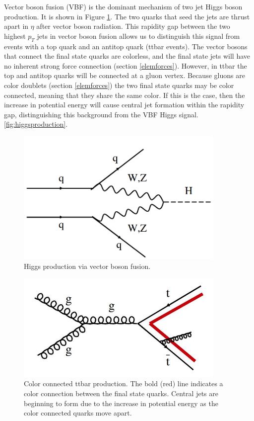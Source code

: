 \documentclass[oneside, letterpaper, oldfontcommands]{memoir}
\begin{document}
\qquad Vector boson fusion (VBF) is the dominant mechanism of two jet Higgs boson production. It is shown in Figure \ref{fig:vbfHiggs}. The two quarks that seed the jets are thrust apart in $\eta$ after vector boson radiation. This rapidity gap between the two highest $p_{T}$ jets in vector boson fusion allows us to distinguish this signal from events with a top quark and an antitop quark (ttbar events). The vector bosons that connect the final state quarks are colorless, and the final state jets will have no inherent strong force connection (section \ref{elemforces}). However, in ttbar the top and antitop quarks will be connected at a gluon vertex. Because gluons are color doublets (section \ref{elemforces}) the two final state quarks may be color connected, meaning that they share the same color. If this is the case, then the increase in potential energy will cause central jet formation within the rapidity gap, distinguishing this background from the VBF Higgs signal. \ref{fig:higgsproduction}\cite{Dittmaier:2011ti}.

\begin{figure}[here]
\includegraphics[width=0.9\textwidth]{vbfHiggs.png}
\caption{Higgs production via vector boson fusion.}
\label{fig:vbfHiggs}
\end{figure}

\begin{figure}[here]
\includegraphics[width=0.9\textwidth]{ttbarcolor.jpg}
\caption{Color connected ttbar production. The bold (red) line indicates a color connection between the final state quarks. Central jets are beginning to form due to the increase in potential energy as the color connected quarks move apart.}
\label{fig:ttbarcolor}
\end{figure}
\end{document}
